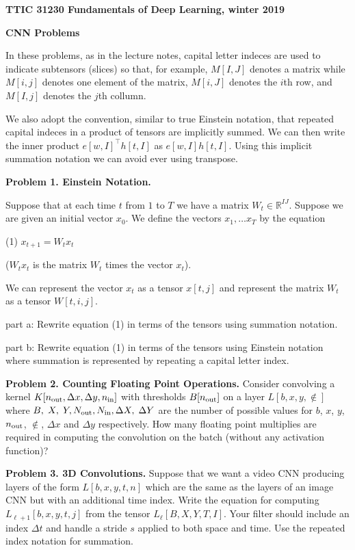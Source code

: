 \documentclass{article}
\newcommand{\solution}[1]{\bigskip {\color{red} {\bf Solution}: #1}}
\begin{document}
\centerline{\bf TTIC 31230 Fundamentals of Deep Learning, winter 2019}

\medskip
\centerline{\bf CNN Problems}

In these problems, as in the lecture notes, capital letter indeces are used to indicate subtensors (slices) so that, for example,  $M[I,J]$ denotes a matrix
while $M[i,j]$ denotes one element of the matrix, $M[i,J]$ denotes the $i$th row, and $M[I,j]$ denotes the $j$th collumn.

\medskip
We also adopt the convention, similar to true Einstein notation, that repeated capital indeces in a product of tensors are implicitly summed.  We can then write
the inner product $e[w,I]^\top h[t,I]$ as $e[w,I]h[t,I]$.  Using this implicit summation notation we can avoid ever using transpose.

\medskip
{\bf Problem 1. Einstein Notation.}

Suppose that at each time $t$ from $1$ to $T$ we have a matrix $W_t \in \mathbb{R}^{IJ}$.  Suppose we are given an initial vector $x_0$.  We define the vectors $x_1,\ldots x_T$ by the equation

(1)  $x_{t+1} = W_t x_t$

($W_t x_t$ is the matrix $W_t$ times the vector $x_t$).

We can represent the vector $x_t$ as a tensor $x[t,j]$ and represent the matrix $W_t$ as a tensor $W[t,i,j]$.

\medskip
part a: Rewrite equation (1) in terms of the tensors using summation notation.

\medskip
part b: Rewrite equation (1) in terms of the tensors using Einstein notation where summation is represented by repeating a capital letter index.

\bigskip
{\bf Problem 2. Counting Floating Point Operations.}  Consider convolving a kernel $K[n_{\mathrm{out}},\Delta x, \Delta y,n_{\mathrm{in}}]$  with thresholds $B[n_{\mathrm{out}}]$ on a layer $L[b,x,y,\nin]$ where $B,\;X,\;Y,N_{\mathrm{out}}, N_{\mathrm{in}},\Delta X,\;\Delta Y$
are the number of possible values for $b$, $x$, $y$, $n_{\mathrm{out}}$, $\nin$, $\Delta x$ and $\Delta y$ respectively.
How many floating point multiplies are required
in computing the convolution on the batch (without any activation function)?

\solution{$$BXY\;\Delta X\;\Delta Y \;\Nout \;\Nin$$}

\bigskip
{\bf Problem 3. 3D Convolutions.} Suppose that we want a video CNN producing
layers of the form $L[b,x,y,t,n]$ which are the same as the layers of an image CNN but with an additional time index.
Write the equation for computing $L_{\ell+1}[b,x,y,t,j]$ from the tensor $L_\ell[B,X,Y,T,I]$.  Your filter should include an index $\Delta t$ and handle a stride $s$ applied
to both space and time. Use the repeated index notation for summation.
\end{document}
